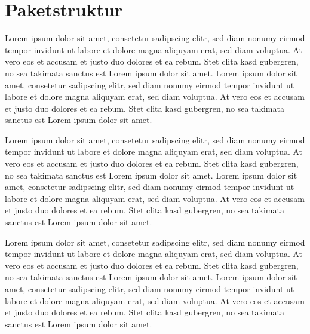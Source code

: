 \documentclass[11pt,a4paper]{report}
\begin{document}
\chapter{Paketstruktur} {

Lorem ipsum dolor sit amet, consetetur sadipscing elitr, sed diam nonumy eirmod tempor invidunt ut labore et dolore magna aliquyam erat, sed diam voluptua. At vero eos et accusam et justo duo dolores et ea rebum. Stet clita kasd gubergren, no sea takimata sanctus est Lorem ipsum dolor sit amet. Lorem ipsum dolor sit amet, consetetur sadipscing elitr, sed diam nonumy eirmod tempor invidunt ut labore et dolore magna aliquyam erat, sed diam voluptua. At vero eos et accusam et justo duo dolores et ea rebum. Stet clita kasd gubergren, no sea takimata sanctus est Lorem ipsum dolor sit amet.

Lorem ipsum dolor sit amet, consetetur sadipscing elitr, sed diam nonumy eirmod tempor invidunt ut labore et dolore magna aliquyam erat, sed diam voluptua. At vero eos et accusam et justo duo dolores et ea rebum. Stet clita kasd gubergren, no sea takimata sanctus est Lorem ipsum dolor sit amet. Lorem ipsum dolor sit amet, consetetur sadipscing elitr, sed diam nonumy eirmod tempor invidunt ut labore et dolore magna aliquyam erat, sed diam voluptua. At vero eos et accusam et justo duo dolores et ea rebum. Stet clita kasd gubergren, no sea takimata sanctus est Lorem ipsum dolor sit amet.

Lorem ipsum dolor sit amet, consetetur sadipscing elitr, sed diam nonumy eirmod tempor invidunt ut labore et dolore magna aliquyam erat, sed diam voluptua. At vero eos et accusam et justo duo dolores et ea rebum. Stet clita kasd gubergren, no sea takimata sanctus est Lorem ipsum dolor sit amet. Lorem ipsum dolor sit amet, consetetur sadipscing elitr, sed diam nonumy eirmod tempor invidunt ut labore et dolore magna aliquyam erat, sed diam voluptua. At vero eos et accusam et justo duo dolores et ea rebum. Stet clita kasd gubergren, no sea takimata sanctus est Lorem ipsum dolor sit amet.

}
\end{document}
